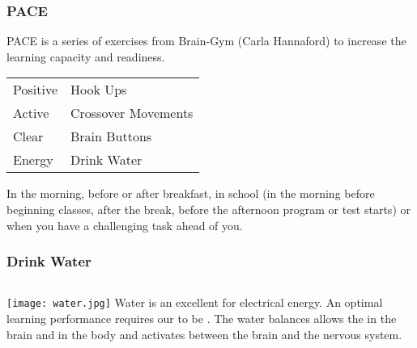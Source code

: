
\begin{frame}
\frametitle{PACE}
PACE is a series of exercises from Brain-Gym (Carla Hannaford) to increase the learning capacity and readiness.


\begin{tabular}{ll}
\alert{P}ositive & Hook Ups\\
\alert{A}ctive & Crossover Movements\\
\alert{C}lear & Brain Buttons\\
\alert{E}nergy & Drink Water\\
\end{tabular}

In the morning, before or after breakfast, in school (in the morning before beginning classes, after the break, before the afternoon program or test starts) or when you have a challenging task ahead of you.\\
\end{frame}
\begin{frame}
\frametitle{Drink Water}


\begin{columns}[c] %
\texttt{[image: water.jpg]}
Water is an excellent  for electrical energy. An optimal learning performance requires our  to be . The water balances allows the  in the brain and in the body and activates  between the brain and the nervous system.
\end{columns}
\end{frame}
